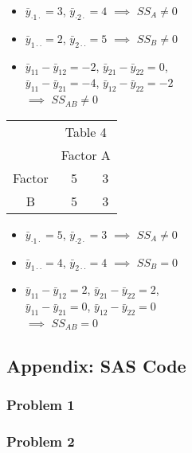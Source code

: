 \documentclass[11pt]{article}
\begin{document}
\begin{enumerate}
\begin{minipage}{0.5\linewidth}
\begin{itemize}
\item \(\bar{y}_{\cdot 1\cdot}=3\), \(\bar{y}_{\cdot 2\cdot}=4\)
\(\implies\) \(SS_A\neq 0\)
\item \(\bar{y}_{1\cdot\cdot}=2\), \(\bar{y}_{2\cdot\cdot}=5\)
\(\implies\) \(SS_B\neq 0\)
\item \(\bar{y}_{11}-\bar{y}_{12}=-2\), \(\bar{y}_{21}-\bar{y}_{22}=0\),\\
\(\bar{y}_{11}-\bar{y}_{21}=-4\), \(\bar{y}_{12}-\bar{y}_{22}=-2\) \\
\(\implies\) \(SS_{AB}\neq 0\)
\end{itemize}

\end{minipage}\begin{minipage}{0.5\linewidth}
\begin{tabular}{c|c|c|}
\multicolumn{1}{c}{} & \multicolumn{2}{c}{Table 4} \\
\multicolumn{1}{c}{} & \multicolumn{2}{c}{Factor A} \\
\cline{2-3}
Factor & ~5~ & 3 \\
\cline{2-3}
B & 5 & 3 \\
\cline{2-3}
\end{tabular}

\begin{itemize}
\item \(\bar{y}_{\cdot 1\cdot}=5\), \(\bar{y}_{\cdot 2\cdot}=3\)
\(\implies\) \(SS_A\neq 0\)
\item \(\bar{y}_{1\cdot\cdot}=4\), \(\bar{y}_{2\cdot\cdot}=4\)
\(\implies\) \(SS_B=0\)
\item \(\bar{y}_{11}-\bar{y}_{12}=2\), \(\bar{y}_{21}-\bar{y}_{22}=2\),\\
\(\bar{y}_{11}-\bar{y}_{21}=0\), \(\bar{y}_{12}-\bar{y}_{22}=0\) \\
\(\implies\) \(SS_{AB}=0\)
\end{itemize}

\end{minipage}

\end{enumerate}

\pagebreak
\subsection*{Appendix: SAS Code}

\subsubsection*{Problem 1}



\pagebreak
\subsubsection*{Problem 2}

\footnotesize
\end{document}
